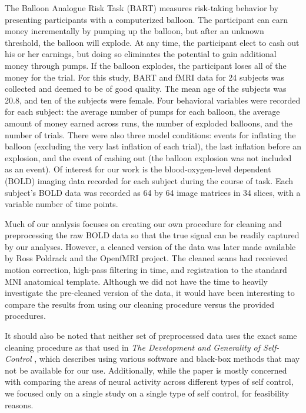 \par \indent The Balloon Analogue Risk Task (BART) measures risk-taking 
behavior by presenting participants with a computerized balloon. The 
participant can earn money incrementally by pumping up the balloon, but after 
an unknown threshold, the balloon will explode. At any time, the participant 
elect to cash out his or her earnings, but doing so eliminates the potential 
to gain additional money through pumps. If the balloon explodes, the 
participant loses all of the money for the trial. For this study, BART and 
fMRI data for 24 subjects was collected and deemed to be of good quality. 
The mean age of the subjects was 20.8, and ten of the subjects were female. 
Four behavioral variables were recorded for each subject: the average number 
of pumps for each balloon, the average amount of money earned across runs, the 
number of exploded balloons, and the number of trials. There were also three 
model conditions: events for inflating the balloon (excluding the very last 
inflation of each trial), the last inflation before an explosion, and the 
event of cashing out (the balloon explosion was not included as an event). Of 
interest for our work is the blood-oxygen-level dependent (BOLD) imaging data 
recorded for each subject during the course of task. Each subject's BOLD data 
was recorded as 64 by 64 image matrices in 34 slices, with a variable number 
of time points. 

\par Much of our analysis focuses on creating our own procedure for cleaning 
and preprocessing the raw BOLD data so that the true signal can be readily 
captured by our analyses. However, a cleaned version of the data was later 
made available by Ross Poldrack and the OpenfMRI project. The cleaned scans 
had receieved motion correction, high-pass filtering in time, and registration 
to the standard MNI anatomical template. Although we did not have the time to 
heavily investigate the pre-cleaned version of the data, it would have been 
interesting to compare the results from using our cleaning procedure versus 
the provided procedures.

\par It should also be noted that neither set of preprocessed data uses the 
exact same cleaning procedure as that used in \textit{The Development and 
Generality of Self-Control} \cite{CohenSelfControl}, which describes using 
various software and black-box methods that may not be available for our use. 
Additionally, while the paper is mostly concerned with comparing the areas of 
neural activity across different types of self control, we focused only on a 
single study on a single type of self control, for feasibility reasons. 
